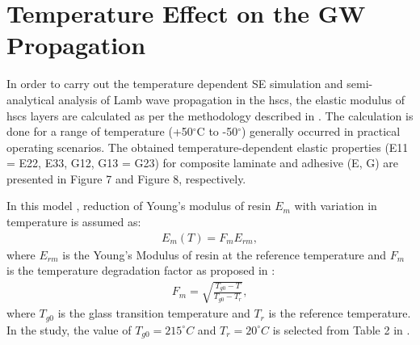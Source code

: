 \section{Temperature Effect on the GW Propagation}
\label{sec:temp}


In order to carry out the temperature dependent SE simulation and semi-analytical analysis of Lamb wave propagation in the \acp{hsc}, the elastic modulus of \acp{hsc} layers are calculated as per the methodology described in \cite{chamis1983simplified,salamone2009guided}. The calculation is done for a range of temperature (+50\(^{\circ}\)C to -50\(^{\circ}\)) generally occurred in practical operating scenarios. The obtained temperature-dependent elastic properties (E11 = E22, E33, G12, G13 = G23) for composite laminate and adhesive (E, G) are presented in Figure 7 and Figure 8, respectively.

In this model \cite{salamone2009guided}, reduction of Young’s modulus of resin \(E_m\) with variation in temperature is assumed as:
\begin{eqnarray}
	E_m(T)=F_m E_{rm},
	\label{eq:factor_temp}
\end{eqnarray}
where \(E_{rm}\) is the Young’s Modulus of resin at the reference temperature and \(F_m\) is the temperature degradation factor as proposed in \cite{chamis1983simplified}:
\begin{eqnarray}
F_m=\sqrt{\frac{T_{g0}-T}{T_{g0}-T_r}},
\label{eq:em_temp}
\end{eqnarray}
where \(T_{g0}\) is the glass transition temperature and \(T_r\) is the reference temperature. In the study, the value of \(T_{g0}=215^{\circ}C\) and \(T_r=20^{\circ}C\) is selected from Table 2 in \cite{chamis1983simplified}. 

